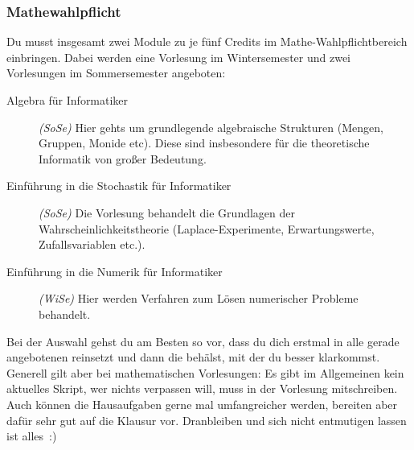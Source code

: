 
\subsubsection{Mathewahlpflicht}
Du musst insgesamt zwei Module zu je fünf Credits
	im Mathe-Wahlpflichtbereich einbringen. Dabei werden eine Vorlesung im Wintersemester und zwei
	Vorlesungen im Sommersemester angeboten:

	
	\begin{description} 
		\item[Algebra für Informatiker] \emph{(SoSe)} Hier gehts um grundlegende
		algebraische Strukturen (Mengen, Gruppen, Monide etc). Diese sind insbesondere für die
		theoretische Informatik von großer Bedeutung.
		\item[Einführung in die Stochastik für Informatiker] \emph{(SoSe)} Die
		Vorlesung behandelt die Grundlagen der
		Wahrscheinlichkeitstheorie (Laplace-Experimente,
		Erwartungswerte, Zufallsvariablen etc.). 
		\item[Einführung in die Numerik für Informatiker] \emph{(WiSe)} Hier werden Verfahren zum Lösen numerischer Probleme behandelt. 
	\end{description}

	Bei der Auswahl gehst du am Besten so vor, dass du dich erstmal
	in alle gerade angebotenen reinsetzt und dann die behälst, mit der du besser
	klarkommst. Generell gilt aber bei mathematischen Vorlesungen: Es
	gibt im Allgemeinen kein aktuelles Skript, wer nichts verpassen
	will, muss in der Vorlesung mitschreiben. Auch können die
	Hausaufgaben gerne mal umfangreicher werden, bereiten aber dafür
	sehr gut auf die Klausur vor. Dranbleiben und sich nicht
	entmutigen lassen ist alles~:)